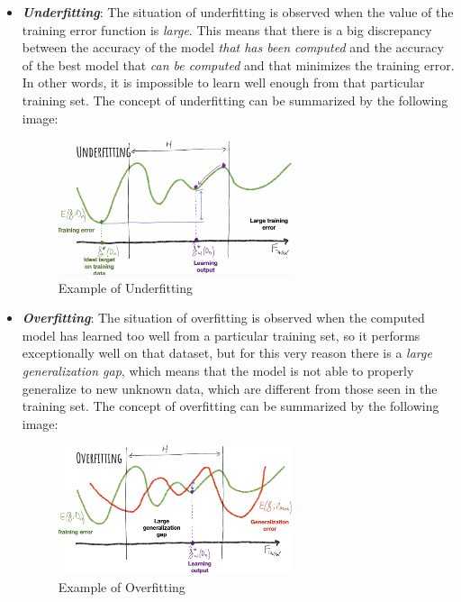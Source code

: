 \begin{itemize}
      \item \emph{\textbf{Underfitting}}: The situation of underfitting is observed
            when the value of the training error function is \emph{large}. This means
            that there is a big discrepancy between the accuracy of the model
            \emph{that has been computed} and the accuracy of the best model that
            \emph{can be computed} and that minimizes the training error. In other words,
            it is impossible to learn well enough from that particular training set.
            The concept of underfitting can be summarized by the following image:

            \begin{figure}[h]
                  \centering
                  \includegraphics[width=0.65\textwidth]{../img/Underfitting}
                  \caption{Example of Underfitting}
            \end{figure}

      \item \emph{\textbf{Overfitting}}: The situation of overfitting is observed
            when the computed model has learned too well from a particular
            training set, so it performs exceptionally well on that dataset, but for
            this very reason there is a \emph{large generalization gap},
            which means that the model is not able to properly generalize to new
            unknown data, which are different from those seen in the training set.
            The concept of overfitting can be summarized by the following image:

            \newpage

            \begin{figure}[h]
                  \centering
                  \includegraphics[width=0.65\textwidth]{../img/Overfitting}
                  \caption{Example of Overfitting}
            \end{figure}

\end{itemize}


